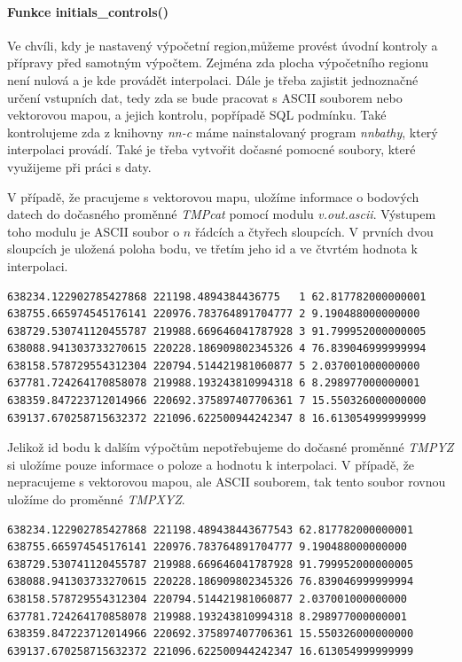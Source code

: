 \documentclass[12pt,a4paper]{article}
\begin{document}
\bigskip
\paragraph{Funkce initials\_controls()}
Ve chvíli, kdy je nastavený výpočetní region,můžeme provést úvodní kontroly a přípravy před samotným výpočtem. Zejména zda plocha výpočetního regionu není nulová a je kde provádět interpolaci. Dále je třeba zajistit jednoznačné určení vstupních dat, tedy zda se bude pracovat s ASCII souborem nebo vektorovou mapou, a jejich kontrolu, popřípadě SQL podmínku. Také kontrolujeme zda z knihovny \emph{nn-c} máme nainstalovaný program \emph{nnbathy}, který interpolaci provádí. Také je třeba vytvořit dočasné pomocné soubory, které využijeme při práci s daty. 

V případě, že pracujeme s vektorovou mapu, uložíme informace o bodových datech do dočasného proměnné \emph{TMPcat} pomocí modulu \emph{v.out.ascii}. Výstupem toho modulu je ASCII soubor o $n$ řádcích a čtyřech sloupcích. V prvních dvou sloupcích je uložená poloha bodu, ve třetím jeho id a ve čtvrtém hodnota k interpolaci. 

\bigskip
\lstset{basicstyle=\footnotesize}
\begin{lstlisting}[caption={Pomocný soubor TMPcat}]
638234.122902785427868 221198.4894384436775   1 62.817782000000001
638755.665974545176141 220976.783764891704777 2 9.190488000000000
638729.530741120455787 219988.669646041787928 3 91.799952000000005
638088.941303733270615 220228.186909802345326 4 76.839046999999994
638158.578729554312304 220794.514421981060877 5 2.037001000000000
637781.724264170858078 219988.193243810994318 6 8.298977000000001
638359.847223712014966 220692.375897407706361 7 15.550326000000000
639137.670258715632372 221096.622500944242347 8 16.613054999999999
\end{lstlisting}

Jelikož id bodu k dalším výpočtům nepotřebujeme do dočasné proměnné \emph{TMPYZ} si uložíme pouze informace o poloze a hodnotu k interpolaci. V případě, že nepracujeme s vektorovou mapou, ale ASCII souborem, tak tento soubor rovnou uložíme do proměnné \emph{TMPXYZ}.

\bigskip
\lstset{basicstyle=\footnotesize}
\begin{lstlisting}[caption={Pomocný soubor TMPXYZ}]
638234.122902785427868 221198.489438443677543 62.817782000000001
638755.665974545176141 220976.783764891704777 9.190488000000000
638729.530741120455787 219988.669646041787928 91.799952000000005
638088.941303733270615 220228.186909802345326 76.839046999999994
638158.578729554312304 220794.514421981060877 2.037001000000000
637781.724264170858078 219988.193243810994318 8.298977000000001
638359.847223712014966 220692.375897407706361 15.550326000000000
639137.670258715632372 221096.622500944242347 16.613054999999999
\end{lstlisting}
\end{document}
